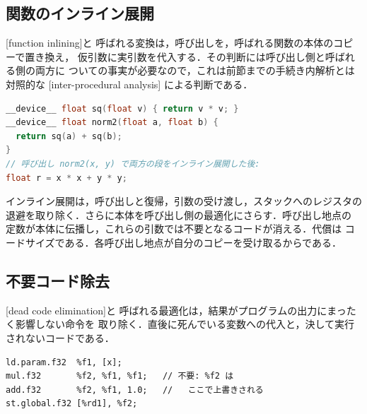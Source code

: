 \documentclass[../main.tex]{subfiles}
\begin{document}
\subsection{関数のインライン展開}

\begin{definition}[関数のインライン展開]
  \label{def:l11-inlining}
  [function inlining]と
  呼ばれる変換は，呼び出しを，呼ばれる関数の本体のコピーで置き換え，
  仮引数に実引数を代入する．その判断には呼び出し側と呼ばれる側の両方に
  ついての事実が必要なので，これは前節までの手続き内解析とは対照的な
  [inter-procedural analysis]
  による判断である．
\end{definition}

\begin{lstlisting}[language=C++, numbers=none]
__device__ float sq(float v) { return v * v; }
__device__ float norm2(float a, float b) {
  return sq(a) + sq(b);
}
// 呼び出し norm2(x, y) で両方の段をインライン展開した後:
float r = x * x + y * y;
\end{lstlisting}

インライン展開は，呼び出しと復帰，引数の受け渡し，スタックへのレジスタの
退避を取り除く．さらに本体を呼び出し側の最適化にさらす．呼び出し地点の
定数が本体に伝播し，これらの引数では不要となるコードが消える．代償は
コードサイズである．各呼び出し地点が自分のコピーを受け取るからである．

\subsection{不要コード除去}

\begin{definition}[不要コード除去]
  \label{def:l11-dce}
  [dead code elimination]と
  呼ばれる最適化は，結果がプログラムの出力にまったく影響しない命令を
  取り除く．直後に死んでいる変数への代入と，決して実行されないコードである．
\end{definition}

\begin{lstlisting}[language=PTX, numbers=none]
ld.param.f32  %f1, [x];
mul.f32       %f2, %f1, %f1;   // 不要: %f2 は
add.f32       %f2, %f1, 1.0;   //   ここで上書きされる
st.global.f32 [%rd1], %f2;
\end{lstlisting}
\end{document}
